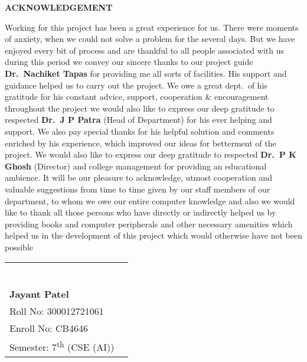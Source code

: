 

\begin{center}
  \Large\textbf{ACKNOWLEDGEMENT}
\end{center}


\begin{justify}
  \linespread{1.5}
  \normalsize 
 Working for this project has been a great experience for us. There were moments of anxiety, when we could not solve a problem for the several days. But we have enjoyed every bit of process and are thankful to all people associated with us during this period we convey our sincere thanks to our project guide \textbf{Dr.\ Nachiket Tapas} for providing me all sorts of facilities. His support and guidance helped us to carry out the project. We owe a great dept.\ of his gratitude for his constant advice, support, cooperation \& encouragement throughout the project we would also like to express our deep gratitude to respected \textbf{Dr.\ J P Patra} (Head of Department) for his ever helping and support. We also pay special thanks for his helpful solution and comments enriched by his experience, which improved our ideas for betterment of the project. We would also like to express our deep gratitude to respected   \textbf{Dr.\ P K Ghosh} (Director) and college management for providing an educational ambience. It will be our pleasure to acknowledge, utmost cooperation and valuable suggestions from time to time given by our staff members of our department, to whom we owe our entire computer knowledge and also we would like to thank all those persons who have directly or indirectly helped us by providing books and computer peripherals and other necessary amenities which helped us in the development of this project which would otherwise have not been possible
\end{justify}


\vspace{2cm}


\normalsize 

\noindent
\begin{tabular}{p{} @{\hspace{2cm}} p{}}
  &
  \centering
  \rule{4cm}{0.4pt} \\
  \textbf{Jayant Patel} \\
  Roll No: 300012721061 \\
  Enroll No: CB4646 \\
  Semester: 7\textsuperscript{th} (CSE (AI)) \\
\end{tabular}

